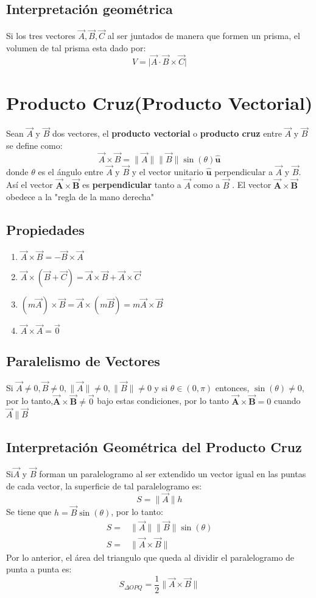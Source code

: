 \documentclass[a4paper]{article}
\newcommand{\abs}[1]{\lVert #1 \rVert}
\begin{document}
\subsection{Interpretación geométrica}
Si los tres vectores $\vec{A},\vec{B},\vec{C}$ al ser juntados de manera que formen un prisma, el volumen de tal prisma esta dado por:
\[V=\lvert \vec{A}\cdot\vec{B}\times\vec{C}\rvert\]
\section{Producto Cruz(Producto Vectorial)}
Sean $\vec{A}$ y $\vec{B}$ dos vectores, el \textbf{producto vectorial} o \textbf{producto cruz} entre $\vec{A}$ y $\vec{B}$ se define como:
\[\vec{A}\times\vec{B}=\abs{\vec{A}}\abs{\vec{B}}\sin(\theta)\boldsymbol{\hat{u}}\]
donde $\theta$ es el ángulo entre $\vec{A}$ y $\vec{B}$ y el vector unitario $\boldsymbol{\hat{u}}$ perpendicular a $\vec{A}$ y $\vec{B}$. Así el vector $\mathbf{\vec{A}\times\vec{B}}$ es \textbf{perpendicular} tanto a $\vec{A}$ como a $\vec{B}$ . El vector $\mathbf{\vec{A}\times\vec{B}}$ obedece a la "regla de la mano derecha"
\subsection{Propiedades}
\begin{enumerate}
\item{$\vec{A}\times\vec{B}=-\vec{B}\times\vec{A}$}
\item{$\vec{A}\times(\vec{B}+\vec{C})=\vec{A}\times\vec{B}+\vec{A}\times\vec{C}$}
\item{$(m\vec{A})\times\vec{B}=\vec{A}\times(m\vec{B})=m\vec{A}\times\vec{B}$}
\item{$\vec{A}\times\vec{A}=\vec{0}$}
\end{enumerate}
\subsection{Paralelismo de Vectores}
Si $\vec{A}\neq 0,\vec{B}\neq 0,\abs{\vec{A}}\neq 0,\abs{\vec{B}}\neq 0$ y si $\theta\in(0,\pi)$ entonces, $\sin(\theta)\neq0$, por lo tanto,$\mathbf{\vec{A}\times\vec{B}}\neq\vec{0}$ bajo estas condiciones, por lo tanto $\mathbf{\vec{A}\times\vec{B}}=0$ cuando $\vec{A}\parallel\vec{B}$ 
\subsection{Interpretación Geométrica del Producto Cruz}
Si$\vec{A}$ y $\vec{B}$ forman un paralelogramo al ser extendido un vector igual en las puntas de cada vector, la superficie de tal paralelogramo es:
\[S=\abs{\vec{A}}h\]
Se tiene que $h=\vec{B}\sin(\theta)$, por lo tanto:
\begin{align*}
S=&\abs{\vec{A}}\abs{\vec{B}}\sin(\theta)\\
S=&\abs{\vec{A}\times\vec{B}}
\end{align*}
Por lo anterior, el área del triangulo que queda al dividir el paralelogramo de punta a punta es:
\[S_{\Delta OPQ}=\frac{1}{2}\abs{\vec{A}\times\vec{B}}\]
\end{document}
